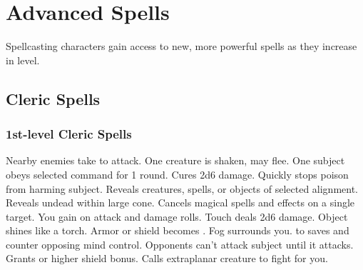 \chapter{Advanced Spells}

Spellcasting characters gain access to new, more powerful spells as they increase in level.

\small

\section{Cleric Spells}

\subsection{1st-level Cleric Spells}
\begin{spelllist}
   Nearby enemies take  to attack.
   One creature is shaken, may flee.
   One subject obeys selected command for 1 round.
   Cures 2d6 damage.
   Quickly stops poison from harming subject.
   Reveals creatures, spells, or objects of selected alignment.
   Reveals undead within large cone.
   Cancels magical spells and effects on a single target.
   You gain  on attack and damage rolls.
   Touch deals 2d6 damage.
   Object shines like a torch.
   Armor or shield becomes .
   Fog surrounds you.
    to saves and counter opposing mind control.
   Opponents can't attack subject until it attacks.
   Grants  or higher shield bonus.
   Calls extraplanar creature to fight for you.
\end{spelllist}

